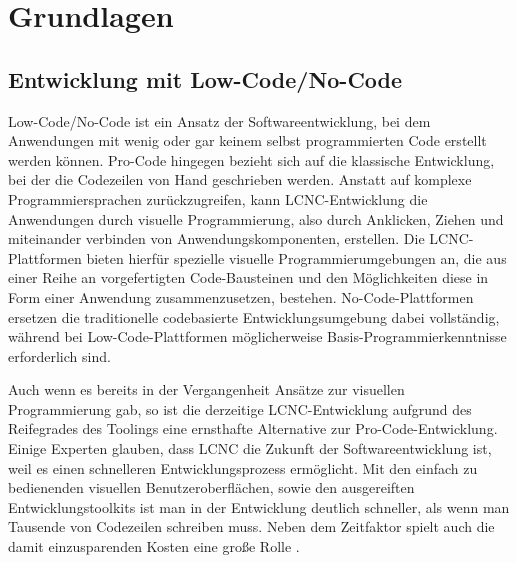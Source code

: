 
\chapter{Grundlagen} \label{GL}

\section{Entwicklung mit Low-Code/No-Code} 

Low-Code/No-Code ist ein Ansatz der Softwareentwicklung, bei dem Anwendungen mit wenig oder gar keinem selbst programmierten Code erstellt werden können. Pro-Code hingegen bezieht sich auf die klassische Entwicklung, bei der die Codezeilen von Hand geschrieben werden. Anstatt auf komplexe Programmiersprachen zurückzugreifen, kann LCNC-Entwicklung die Anwendungen durch visuelle Programmierung, also durch Anklicken, Ziehen und miteinander verbinden von Anwendungskomponenten, erstellen. Die LCNC-Plattformen bieten hierfür spezielle visuelle Programmierumgebungen an, die aus einer Reihe an vorgefertigten Code-Bausteinen und den Möglichkeiten diese in Form einer Anwendung zusammenzusetzen, bestehen. No-Code-Plattformen ersetzen die traditionelle codebasierte Entwicklungsumgebung dabei vollständig, während bei Low-Code-Plattformen möglicherweise Basis-Programmierkenntnisse erforderlich sind.
 
Auch wenn es bereits in der Vergangenheit Ansätze zur visuellen Programmierung gab, so ist die derzeitige LCNC-Entwicklung aufgrund des Reifegrades des Toolings eine ernsthafte Alternative zur Pro-Code-Entwicklung. Einige Experten glauben, dass LCNC die Zukunft der Softwareentwicklung ist, weil es einen schnelleren Entwicklungsprozess ermöglicht. Mit den einfach zu bedienenden visuellen Benutzeroberflächen, sowie den ausgereiften Entwicklungstoolkits ist man in der Entwicklung deutlich schneller, als wenn man Tausende von Codezeilen schreiben muss. Neben dem Zeitfaktor spielt auch die damit einzusparenden Kosten eine große Rolle \cite{lcnc:zlcp}.

